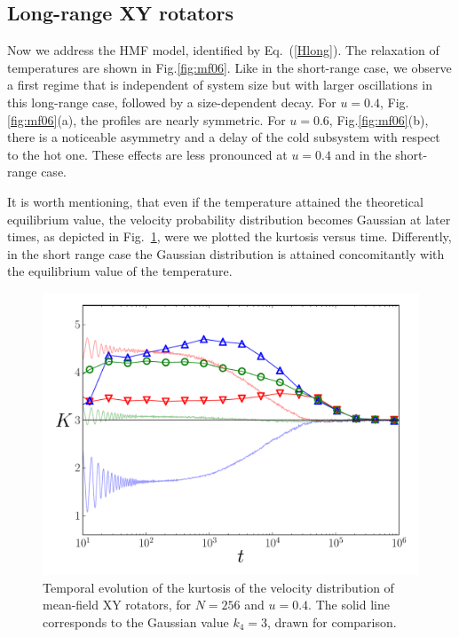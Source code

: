 \documentclass[aps,pre,showpacs,twocolumn,superscriptaddress,floatfix]{revtex4-1}
\begin{document}
\subsection{Long-range XY rotators}
\label{sec:long}




Now we address  the HMF model, identified  by Eq.~(\ref{Hlong}).  
%
The relaxation of temperatures are shown in Fig.\ref{fig:mf06}. 
Like in the short-range case, we observe a first regime that is independent of system size but 
with larger oscillations in this long-range case, followed by a size-dependent decay. 
For $u=0.4$, Fig.\ref{fig:mf06}(a), the profiles are nearly symmetric. 
For $u=0.6$, Fig.\ref{fig:mf06}(b), there is a noticeable asymmetry and a delay of the cold subsystem 
with respect to the hot one. These effects are less pronounced at $u=0.4$ and in the short-range case. 




It is worth mentioning, that even if the temperature attained the theoretical equilibrium 
value, the velocity probability distribution becomes Gaussian at later times, as depicted in 
Fig.~\ref{fig:Kurt_HMF}, were we plotted the kurtosis versus time.   
Differently, in the short range case the Gaussian distribution is attained concomitantly with 
the equilibrium value of the temperature. 


\begin{figure}[h]
 \centering
 \includegraphics[width=0.95\linewidth]{./Kurt_HMF__U_0.4__N_256.pdf}
 \caption{Temporal evolution of the kurtosis of the velocity distribution of mean-field XY 
 rotators, for $N=256$ and $u=0.4$. 
The solid line corresponds to the Gaussian value   $k_4=3$, drawn for comparison.
}
 \label{fig:Kurt_HMF}
\end{figure}
\end{document}
